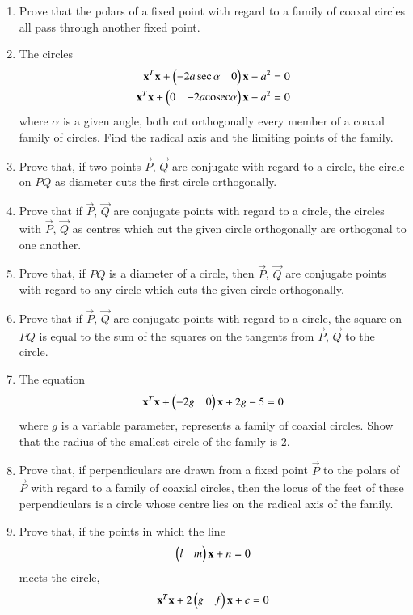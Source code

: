 \begin{enumerate}[label=\arabic*.,ref=\thesubsection.\theenumi]
 \item Prove that the polars of a fixed point with regard to a family of coaxal circles all pass through another fixed point.
 \item The circles
 \begin{align}
\mathbf{x}^T\mathbf{x}+\begin{pmatrix}-2a\sec\alpha & 0\end{pmatrix}\mathbf{x}-a^2 = 0
 \\
\mathbf{x}^T\mathbf{x}+\begin{pmatrix}0 & -2a\text{cosec}\alpha\end{pmatrix}\mathbf{x}-a^2 = 0
 \end{align}
 where $\alpha$ is a given angle, both cut orthogonally every member of a coaxal family of circles.  Find the radical axis and the limiting
 points of the family.
 \item Prove that, if two points $\vec{P}$, $\vec{Q}$ are conjugate with regard to a circle, the circle on $PQ$ as diameter cuts the first circle orthogonally. 
 \item Prove that if $\vec{P}$, $\vec{Q}$ are conjugate points with regard to a circle, the circles
 with $\vec{P}$, $\vec{Q}$ as centres which cut the given circle orthogonally are orthogonal to one another.
 \item Prove that, if $PQ$ is a diameter of a circle, then $\vec{P}$, $\vec{Q}$ are conjugate points with regard to
 any circle which cuts the given circle orthogonally.
 \item Prove that if $\vec{P}$, $\vec{Q}$ are conjugate points with regard to a circle, the square on $PQ$ is equal to the
 sum of the squares on the tangents from $\vec{P}$, $\vec{Q}$ to the circle.
 \item The equation 
 \begin{align}
\mathbf{x}^T\mathbf{x}+\begin{pmatrix}-2g & 0\end{pmatrix}\mathbf{x}+2g-5 = 0
 \end{align}
 where $g$ is a variable parameter, represents a family of coaxial circles.  
 Show that the radius of the smallest circle of the family is 2.
 \item Prove that, if perpendiculars are drawn from a fixed point $\vec{P}$ to the polars of $\vec{P}$ with regard to a
 family of coaxial circles, then the locus of the feet of these perpendiculars is a circle whose centre
 lies on the radical axis of the family.
 \item Prove that, if the points in which the line 
 \begin{align}
\begin{pmatrix}l & m\end{pmatrix}\mathbf{x}+n=0
 \end{align}
meets the circle, 
 \begin{align}
\mathbf{x}^T\mathbf{x}+2\begin{pmatrix}g & f\end{pmatrix}\mathbf{x}+c = 0
 \end{align}

\end{enumerate}
